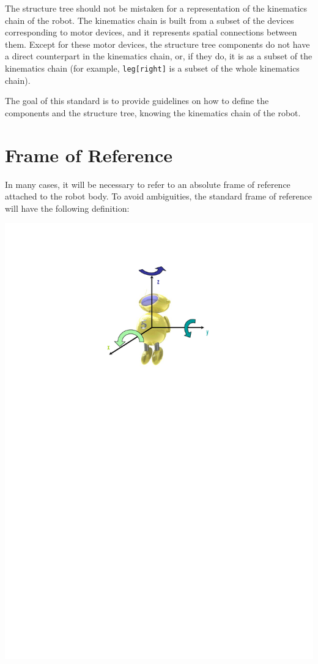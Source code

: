 The structure tree should not be mistaken for a representation of the
kinematics chain of the robot. The kinematics chain is built from a subset
of the devices corresponding to motor devices, and it represents spatial
connections between them. Except for these motor devices, the structure tree
components do not have a direct counterpart in the kinematics chain, or, if
they do, it is as a subset of the kinematics chain (for example,
\lstinline{leg[right]} is a subset of the whole kinematics chain).


The goal of this standard is to provide guidelines on how to define
the components and the structure tree, knowing the kinematics chain of
the robot.

\section{Frame of Reference}

In many cases, it will be necessary to refer to an absolute frame of
reference attached to the robot body. To avoid ambiguities, the
standard frame of reference will have the following definition:

\begin{center}
  \includegraphics{img/reference-frame}
\end{center}

